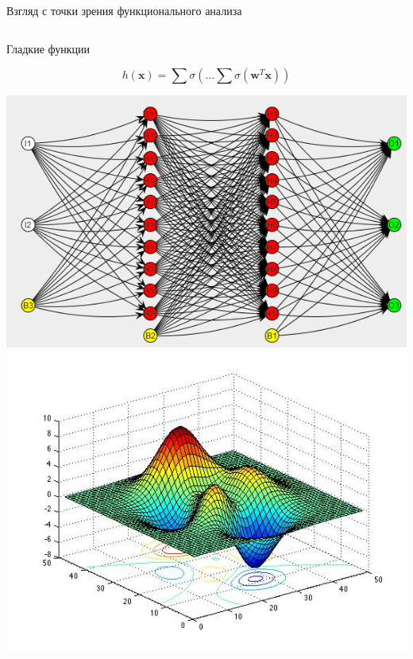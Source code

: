 \documentclass[10pt]{beamer}
\begin{document}
\begin{frame}{Взгляд с точки зрения функционального анализа}
\begin{columns}[C]
        \centering
        \begin{column}{.5\textwidth}
                \begin{block}{Гладкие функции}
                \end{block}
                \[
                    h(\mathbf{x}) = \sum \sigma ( \ldots \sum \sigma
                    (\mathbf{w}^T \mathbf{x}) )
                \]
                \begin{center}
                    \includegraphics[scale=0.2]{images/nn.png}\\
                    \includegraphics[scale=0.2]{images/nnsurface.jpg}
                \end{center}

\end{column}
\end{columns}
\end{frame}
\end{document}
